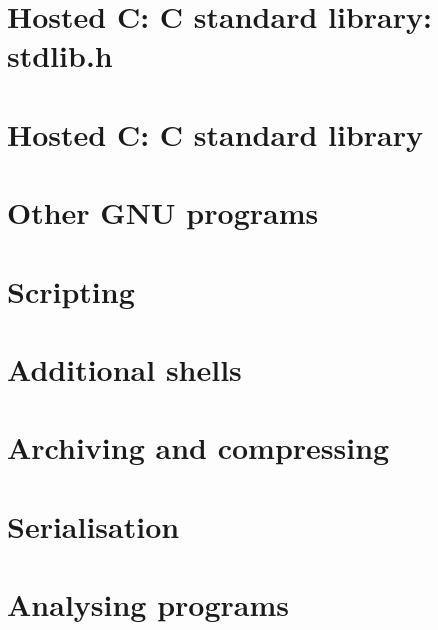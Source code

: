 \documentclass[oneside]{book}
\begin{document}
\part{Hosted C: C standard library: stdlib.h}






\part{Hosted C: C standard library}












\part{Other GNU programs}







\part{Scripting}



\part{Additional shells}






\part{Archiving and compressing}




\part{Serialisation}






\part{Analysing programs}


\end{document}
